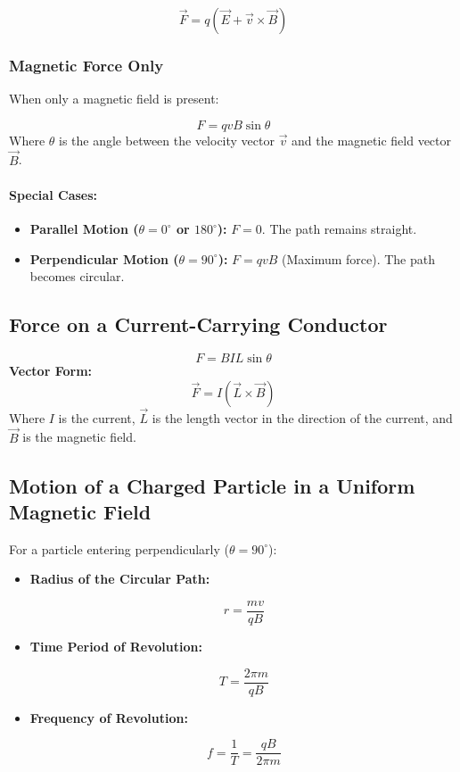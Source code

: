 \documentclass[11pt,a4paper]{article}
\begin{document}
\begin{formulabox}
    \[ \vec{F} = q(\vec{E} + \vec{v} \times \vec{B}) \]
\end{formulabox}

\subsubsection{Magnetic Force Only}
When only a magnetic field is present:
\begin{formulabox}
    \[ F = qvB \sin\theta \]
    Where $\theta$ is the angle between the velocity vector $\vec{v}$ and the magnetic field vector $\vec{B}$.
\end{formulabox}

\paragraph{Special Cases:}
\begin{itemize}
    \item \textbf{Parallel Motion ($\theta = 0^\circ$ or $180^\circ$):} $F = 0$. The path remains straight.
    \item \textbf{Perpendicular Motion ($\theta = 90^\circ$):} $F = qvB$ (Maximum force). The path becomes circular.
\end{itemize}

\subsection{Force on a Current-Carrying Conductor}
\begin{formulabox}
    \[ F = BIL \sin\theta \]
    \textbf{Vector Form:}
    \[ \vec{F} = I (\vec{L} \times \vec{B}) \]
    Where $I$ is the current, $\vec{L}$ is the length vector in the direction of the current, and $\vec{B}$ is the magnetic field.
\end{formulabox}

\subsection{Motion of a Charged Particle in a Uniform Magnetic Field}
For a particle entering perpendicularly ($\theta = 90^\circ$):
\begin{itemize}
    \item \textbf{Radius of the Circular Path:}
    \begin{formulabox}
        \[ r = \frac{mv}{qB} \]
    \end{formulabox}
    \item \textbf{Time Period of Revolution:}
    \begin{formulabox}
        \[ T = \frac{2\pi m}{qB} \]
    \end{formulabox}
    \item \textbf{Frequency of Revolution:}
    \begin{formulabox}[Frequency]
        \[ f = \frac{1}{T} = \frac{qB}{2\pi m} \]
    \end{formulabox}
\end{itemize}
\end{document}
